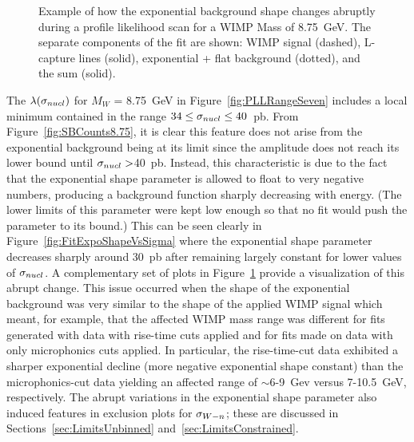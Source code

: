 			\begin{figure}
				\centering
				\caption[Abrupt changed of exponential background shape during fitting]
				{Example of how the exponential background shape changes abruptly during a profile 
				likelihood scan for a WIMP Mass of 8.75~GeV.  The separate components of the fit are shown: 
				WIMP signal (dashed), L-capture lines (solid), exponential + flat background (dotted), and the 
				sum (solid). }
				\label{fig:FitExpoFitExample}
			\end{figure}	

The $\lambda(\sigma_{nucl})$ for $M_{W}$ = 8.75~GeV in Figure~\ref{fig:PLLRangeSeven} includes a local minimum contained in the range $34\leq\sigma_{nucl}\leq40$~pb.  From Figure~\ref{fig:SBCounts8.75}, it is clear this feature does not arise from the exponential background being at its limit since the amplitude does not reach its lower bound until $\sigma_{nucl}>$40~pb.  Instead, this characteristic is due to the fact that the exponential shape parameter is allowed to float to very negative numbers, producing a background function sharply decreasing with energy.  (The lower limits of this parameter were kept low enough so that no fit would push the parameter to its bound.)  This can be seen clearly in Figure~\ref{fig:FitExpoShapeVsSigma} where the exponential shape parameter decreases sharply around 30~pb after remaining largely constant for lower values of $\sigma_{nucl}$.  A complementary set of plots in Figure~\ref{fig:FitExpoFitExample} provide a visualization of this abrupt change.  This issue occurred when the shape of the exponential background was very similar to the shape of the applied WIMP signal which meant, for example, that the affected WIMP mass range was different for fits generated with data with rise-time cuts applied and for fits made on data with only microphonics cuts applied.  In particular, the rise-time-cut data exhibited a sharper exponential decline (more negative exponential shape constant) than the microphonics-cut data yielding an affected range of $\sim$6-9~Gev versus 7-10.5~GeV, respectively.  The abrupt variations in the exponential shape parameter also induced features in exclusion plots for $\sigma_{W-n}$; these are discussed in Sections~\ref{sec:LimitsUnbinned} and~\ref{sec:LimitsConstrained}.

